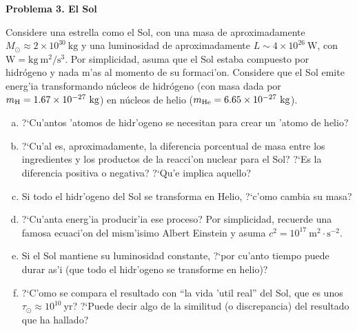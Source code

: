 \documentclass{article}
\begin{document}
\newpage

\textbf{Problema 3. El Sol}

\vspace{3mm}


Considere una estrella como el Sol, con una masa de aproximadamente $M_\odot \approx 2 \times 10^{30} \ \text{kg}$ y una luminosidad de aproximadamente $L \sim 4 \times 10^{26} \ \text{W}$, con $\text{W} = \text{kg} \ \text{m}^2/\text{s}^3$. Por simplicidad, asuma que el Sol estaba
compuesto por hidrógeno y nada m'as al momento de su formaci'on. Considere que el Sol emite energ'ia
transformando núcleos de hidrógeno (con masa dada por $m_{\rm H} = 1.67 \times 10^{-27} \ \text{kg}$) en núcleos de helio ($m_{\rm He} = 6.65 \times 10^{-27} \ \text{kg}$).

\begin{enumerate} [a)]
\item ?`Cu'antos 'atomos de hidr'ogeno se necesitan para crear un 'atomo de helio?
\item ?`Cu'al es, aproximadamente, la diferencia porcentual de masa entre los ingredientes y los productos de la reacci'on nuclear para el Sol? ?`Es la diferencia positiva o negativa? ?`Qu'e implica aquello?
\item Si todo el hidr'ogeno del Sol se transforma en Helio, ?`c'omo cambia su masa?
\item ?`Cu'anta energ'ia producir'ia ese proceso? Por simplicidad, recuerde una famosa ecuaci'on del mism'isimo Albert Einstein y asuma $c^2 = 10^{17} \ \text{m}^2\cdot \text{s}^{-2}$.
\item Si el Sol mantiene su luminosidad constante, ?`por cu'anto tiempo puede durar as'i (que todo el hidr'ogeno se transforme en helio)?
\item ?`C'omo se compara el resultado con ``la vida 'util real'' del Sol, que es unos $\tau_\odot \approx 10^{10} \ \text{yr}$? ?`Puede decir algo de la similitud (o discrepancia) del resultado que ha hallado?
\end{enumerate}
\end{document}

